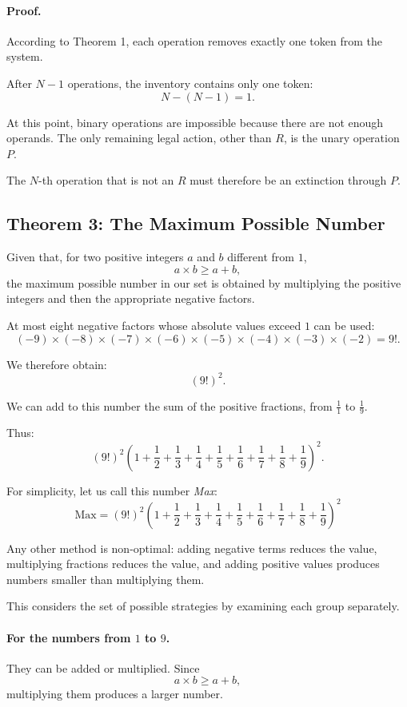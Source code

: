 \documentclass[12pt,a4paper]{article}
\begin{document}
\paragraph{Proof.}
According to Theorem 1, each operation removes exactly one token
from the system.

After $N-1$ operations, the inventory contains only one token:
\[
N-(N-1)=1.
\]

At this point, binary operations are impossible because there are
not enough operands. The only remaining legal action, other than
$R$, is the unary operation $P$.

The $N$-th operation that is not an $R$ must therefore be an
extinction through $P$.

\subsection{Theorem 3: The Maximum Possible Number}

Given that, for two positive integers $a$ and $b$ different from $1$,
\[
a \times b \geq a+b,
\]
the maximum possible number in our set is obtained by multiplying
the positive integers and then the appropriate negative factors.

At most eight negative factors whose absolute values exceed $1$
can be used:
\[
(-9)\times(-8)\times(-7)\times(-6)\times(-5)
\times(-4)\times(-3)\times(-2)=9!.
\]

We therefore obtain:
\[
(9!)^2.
\]

We can add to this number the sum of the positive fractions,
from $\frac{1}{1}$ to $\frac{1}{9}$.

Thus:
\[
(9!)^2
\left(
1+\frac12+\frac13+\frac14+\frac15+
\frac16+\frac17+\frac18+\frac19
\right)^2.
\]

For simplicity, let us call this number \textit{Max}:
\[
\boxed{
\mathrm{Max}=(9!)^2
\left(
1+\frac12+\frac13+\frac14+\frac15+
\frac16+\frac17+\frac18+\frac19
\right)^2
}
\]

Any other method is non-optimal: adding negative terms reduces the
value, multiplying fractions reduces the value, and adding positive
values produces numbers smaller than multiplying them.

This considers the set of possible strategies by examining each
group separately.

\paragraph{For the numbers from $1$ to $9$.}
They can be added or multiplied. Since
\[
a\times b\geq a+b,
\]
multiplying them produces a larger number.
\end{document}

